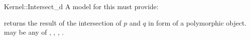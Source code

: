 \begin{ccRefFunctionObjectConcept}{Kernel::Intersect_d}
A model for this must provide:


{returns the result of the intersection of $p$ and $q$ in form of a
  polymorphic object.  may be any of
  , , ,
  .  }

\end{ccRefFunctionObjectConcept}
